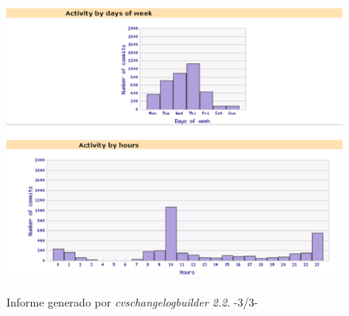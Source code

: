 \documentclass[a4paper]{article}
\begin{document}
        \begin{figure}[!ht]
            \centering
                    \includegraphics[width=12.5cm,height=9.3cm]{cvs2.eps}\\
                \caption{Informe generado por \emph{cvschangelogbuilder 2.2}. -3/3-}
                \label{cvs2}
        \end{figure}\par
\end{document}

